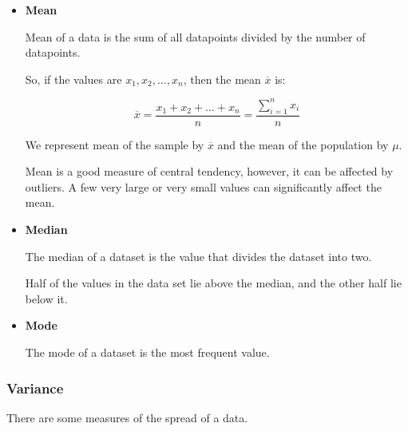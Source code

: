 \documentclass[twocolumn]{article}
\begin{document}
\begin{itemize}
    \item \textbf{Mean}
    
    Mean of a data is the sum of all datapoints divided by the number of datapoints. 

    So, if the values are $x_1, x_2, \dots, x_n$, then the mean $\overline{x}$ is:

    \[
        \overline{x} = \frac{x_1 + x_2 + \dots + x_n}{n} = \frac{\displaystyle \sum_{i=1}^{n}x_i}{n}
    \]

    We represent mean of the sample by $\overline{x}$ and the mean of the population by $\mu$.

    Mean is a good measure of central tendency, however, it can be affected by outliers. A few very large or very small values can significantly affect the mean.

    \item \textbf{Median}
    
    The median of a dataset is the value that divides the dataset into two. 

    Half of the values in the data set lie above the median, and the other half lie below it.

    \item \textbf{Mode} 
    
    The mode of a dataset is the most frequent value.

\end{itemize}

\subsubsection{Variance}
There are some measures of the spread of a data. 
\end{document}
